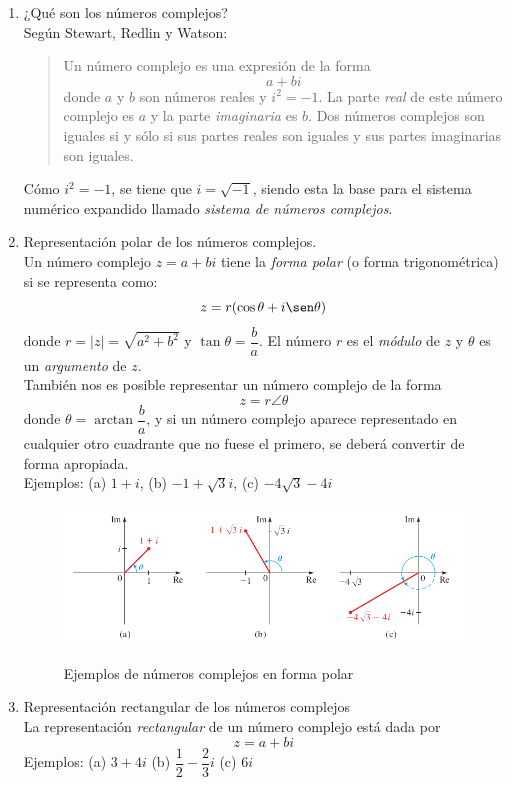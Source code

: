 \documentclass[a4paper,12pt]{article}
\begin{document}
\begin{enumerate}
	\item ¿Qué son los números complejos? \\ Según Stewart, Redlin y Watson:
	\begin{quotation}
		Un número complejo es una expresión de la forma
		\[a + bi\]
		donde $a$ y $b$ son números reales y $i^2 = -1$. La parte \emph{real} de este número complejo es $a$ y la parte \emph{imaginaria} es $b$. Dos números complejos son iguales si y sólo si sus partes reales son iguales y sus partes imaginarias son iguales.
	\end{quotation}
	Cómo $i^2 = -1$, se tiene que $i = \sqrt{-1}$, siendo esta la base para el sistema numérico expandido llamado \emph{sistema de números complejos}.
	
	\item Representación polar de los números complejos.\\ Un número complejo $z = a + bi$ tiene la \emph{forma polar} (o forma trigonométrica) si se representa como:
	\[z = r(\cos \theta + i \sen \theta)\]
	donde $r = |z| = \sqrt{a^2 + b^2}$ y $\tan \theta = \dfrac{b}{a}$. El número $r$ es el \emph{módulo} de $z$ y $\theta$ es un \emph{argumento} de $z$. \\
	También nos es posible representar un número complejo de la forma \[z = r \angle \theta\] donde $\theta = \arctan \dfrac{b}{a}$, y si un número complejo aparece representado en cualquier otro cuadrante que no fuese el primero, se deberá convertir de forma apropiada.\\
	\vspace{0.5cm}
	Ejemplos: (a) $1 + i$, (b) $-1 + \sqrt{3} i$, (c) $-4\sqrt{3} -4i$ \\


	\begin{figure}[!h]
	\centering
		\includegraphics[width=.8\textwidth]{fig1}
		\label{fig1}
		\caption{Ejemplos de números complejos en forma polar}
	\end{figure}

	\item Representación rectangular de los números complejos \\ La representación \emph{rectangular} de un número complejo está dada por \[z = a + bi\]
	Ejemplos: (a) $3 + 4i$ (b) $\dfrac{1}{2} - \dfrac{2}{3} i$ (c) $6i$


\end{enumerate}
\end{document}

